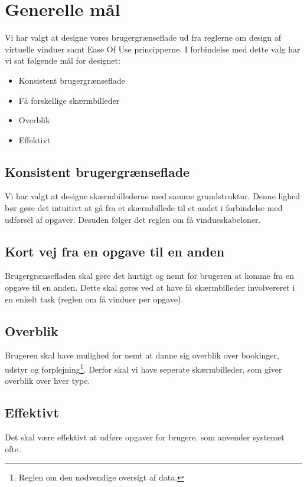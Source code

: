 \section{Generelle mål}
\label{Design_G_Goals}
Vi har valgt at designe vores brugergrænseflade ud fra reglerne om design af virtuelle vinduer\cite[s. 169]{SL_UID} samt Ease Of Use principperne\cite[s. 9]{SL_UID}. I forbindelse med dette valg har vi sat følgende mål for designet:
\begin{itemize}
\item Konsistent brugergrænseflade
\item Få forskellige skærmbilleder
\item Overblik
\item Effektivt
\end{itemize}

\subsection{Konsistent brugergrænseflade}
Vi har valgt at designe skærmbillederne med samme grundstruktur. Denne lighed bør gøre det intuitivt at gå fra et skærmbillede til et andet i forbindelse med udførsel af opgaver. Desuden følger det reglen om få vindueskabeloner.

\subsection{Kort vej fra en opgave til en anden}
Brugergrænsefladen skal gøre det hurtigt og nemt for brugeren at komme fra en opgave til en anden. Dette skal gøres ved at have få skærmbilleder involvereret i en enkelt task (reglen om få vinduer per opgave).

\subsection{Overblik}
Brugeren skal have mulighed for nemt at danne sig overblik over bookinger, udstyr og forplejning\footnote{Reglen om den nødvendige oversigt af data.}. Derfor skal vi have seperate skærmbilleder, som giver overblik over hver type.

\subsection{Effektivt}
Det skal være effektivt at udføre opgaver for brugere, som anvender systemet ofte.